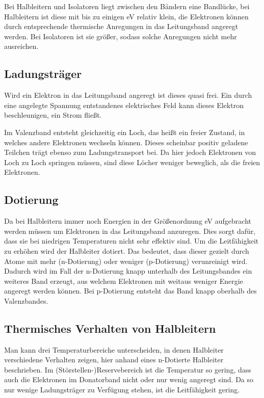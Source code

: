 Bei Halbleitern und Isolatoren liegt zwischen den Bändern eine Bandlücke, bei
Halbleitern ist diese mit bis zu einigen \si{\electronvolt} relativ klein, die
Elektronen können durch entsprechende thermische Anregungen in das Leitungsband
angeregt werden. Bei Isolatoren ist sie größer, sodass solche Anregungen nicht
mehr ausreichen.

\subsection{Ladungsträger}

Wird ein Elektron in das Leitungsband angeregt ist dieses quasi frei. Ein durch
eine angelegte Spannung entstandenes elektrisches Feld kann dieses Elektron
beschleunigen, ein Strom fließt.

Im Valenzband entsteht gleichzeitig ein Loch, das heißt ein freier Zustand, in
welches andere Elektronen wechseln können. Dieses scheinbar positiv geladene
Teilchen trägt ebenso zum Ladungstransport bei. Da hier jedoch Elektronen von
Loch zu Loch springen müssen, sind diese Löcher weniger beweglich, als die
freien Elektronen.

\subsection{Dotierung}

Da bei Halbleitern immer noch Energien in der Größenordnung \si{\electronvolt}
aufgebracht werden müssen um Elektronen in das Leitungsband anzuregen. Dies
sorgt dafür, dass sie bei niedrigen Temperaturen nicht sehr effektiv sind. Um
die Leitfähigkeit zu erhöhen wird der Halbleiter dotiert. Das bedeutet, dass
dieser gezielt durch Atome mit mehr (n-Dotierung) oder weniger (p-Dotierung)
verunreinigt wird. Dadurch wird im Fall der n-Dotierung knapp unterhalb des
Leitungsbandes ein weiteres Band erzeugt, aus welchem Elektronen mit weitaus
weniger Energie angeregt werden können. Bei p-Dotierung entsteht das Band knapp
oberhalb des Valenzbandes.

\subsection{Thermisches Verhalten von Halbleitern}

Man kann drei Temperaturbereiche unterscheiden, in denen Halbleiter
verschiedene Verhalten zeigen, hier anhand eines n-Dotierte Halbleiter
beschrieben. Im (Störstellen-)Reservebereich ist die Temperatur so gering, dass
auch die Elektronen im Donatorband nicht oder nur wenig angeregt sind. Da so
nur wenige Ladungsträger zu Verfügung stehen, ist die Leitfähigkeit gering.

